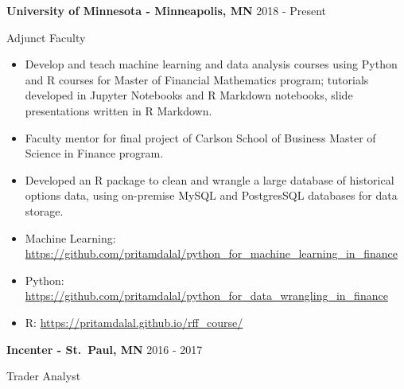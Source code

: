 \documentclass[11pt,a4paper,]{awesome-cv}
\begin{document}
\normalsize

\textbf{University of Minnesota - Minneapolis, MN} \hfill 2018 - Present

\vspace{-1ex}

Adjunct Faculty

\vspace{-1.5ex}

\small

\begin{itemize}
\item
  Develop and teach machine learning and data analysis courses using
  Python and R courses for Master of Financial Mathematics program;
  tutorials developed in Jupyter Notebooks and R Markdown notebooks,
  slide presentations written in R Markdown. \vspace{-0.5ex}
\item
  Faculty mentor for final project of Carlson School of Business Master
  of Science in Finance program. \vspace{-0.5ex}
\item
  Developed an R package to clean and wrangle a large database of
  historical options data, using on-premise MySQL and PostgresSQL
  databases for data storage. \vspace{-0.5ex}
\item
  Machine Learning:
  \href{https://github.com/pritamdalal/python\_for\_machine\_learning\_in\_finance}{https://github.com/pritamdalal/python\_for\_machine\_learning\_in\_finance}
  \vspace{-0.5ex}
\item
  Python:
  \href{https://github.com/pritamdalal/python\_for\_data\_wrangling\_in\_finance}{https://github.com/pritamdalal/python\_for\_data\_wrangling\_in\_finance}
  \vspace{-0.5ex}
\item
  R:
  \href{https://pritamdalal.github.io/rff\_course/}{https://pritamdalal.github.io/rff\_course/}
  \vspace{-0.5ex}
\end{itemize}

\normalsize

\textbf{Incenter - St.~Paul, MN} \hfill 2016 - 2017

\vspace{-1ex}

Trader Analyst

\vspace{-1.5ex}

\small
\end{document}
